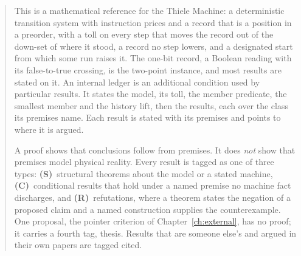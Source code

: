 \documentclass[11pt, a4paper]{report}
\theoremstyle{definition}
\theoremstyle{plain}
\begin{document}
\begin{abstract}
This is a mathematical reference for the Thiele Machine: a deterministic transition system with instruction prices and a record that is a position in a preorder, with a toll on every step that moves the record out of the down-set of where it stood, a record no step lowers, and a designated start from which some run raises it. The one-bit record, a Boolean reading with its false-to-true crossing, is the two-point instance, and most results are stated on it. An internal ledger is an additional condition used by particular results. It states the model, its toll, the member predicate, the smallest member and the history lift, then the results, each over the class its premises name. Each result is stated with its premises and points to where it is argued.

A proof shows that conclusions follow from premises. It does \emph{not} show that premises model physical reality. Every result is tagged as one of three types: \textbf{(S)}~structural theorems about the model or a stated machine, \textbf{(C)}~conditional results that hold under a named premise no machine fact discharges, and \textbf{(R)}~refutations, where a theorem states the negation of a proposed claim and a named construction supplies the counterexample. One proposal, the pointer criterion of Chapter~\ref{ch:external}, has no proof; it carries a fourth tag, thesis. Results that are someone else's and argued in their own papers are tagged cited.


\end{abstract}
\end{document}

